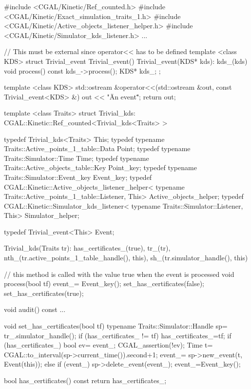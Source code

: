 \label{fig:trivial_usage_program}

\begin{ccExampleCode}
#include <CGAL/Kinetic/Ref_counted.h>
#include <CGAL/Kinetic/Exact_simulation_traits_1.h>
#include <CGAL/Kinetic/Active_objects_listener_helper.h>
#include <CGAL/Kinetic/Simulator_kds_listener.h>
...

// This must be external since operator<< has to be defined
template <class KDS>
struct Trivial_event
{
  Trivial_event(){}
  Trivial_event(KDS* kds): kds_(kds) {
  }
  void process() const
  {
    kds_->process();
  }
  KDS* kds_;
};

template <class KDS>
std::ostream &operator<<(std::ostream &out,
			 const Trivial_event<KDS> &) {
  out << "\"An event\"";
  return out;
}


template <class Traits>
struct Trivial_kds: CGAL::Kinetic::Ref_counted<Trivial_kds<Traits> >
{
  typedef Trivial_kds<Traits> This;
  typedef typename Traits::Active_points_1_table::Data Point;
  typedef typename Traits::Simulator::Time Time;
  typedef typename Traits::Active_objects_table::Key Point_key;
  typedef typename Traits::Simulator::Event_key Event_key;
  typedef CGAL::Kinetic::Active_objects_listener_helper<
    typename Traits::Active_points_1_table::Listener, This> Active_objects_helper;
  typedef CGAL::Kinetic::Simulator_kds_listener<
    typename Traits::Simulator::Listener, This> Simulator_helper;

  typedef Trivial_event<This> Event;

  Trivial_kds(Traits tr): has_certificates_(true),
			  tr_(tr),
			  nth_(tr.active_points_1_table_handle(), this),
			  sh_(tr.simulator_handle(), this){}

  // this method is called with the value true when the event is processed
  void process(bool tf) {
     event_= Event_key();
     set_has_certificates(false);
     set_has_certificates(true);
  }

  void audit() const
  {
     ...
  }

  void set_has_certificates(bool tf) {
    typename Traits::Simulator::Handle sp= tr_.simulator_handle();
    if (has_certificates_ != tf) {
      has_certificates_=tf;
      if (has_certificates_) {
	bool ev= event_;
	CGAL_assertion(!ev);
	Time t= CGAL::to_interval(sp->current_time()).second+1;
	event_= sp->new_event(t, Event(this));
      } else if (event_) {
	sp->delete_event(event_);
	event_=Event_key();
      }
    }
  }

  bool has_certificates() const {
    return has_certificates_;
  }

}
\end{ccExampleCode}
